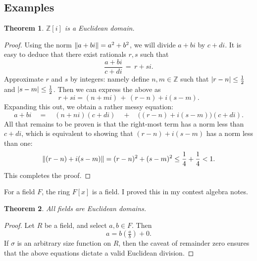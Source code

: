 \documentclass[11pt]{article}
\newtheorem{theorem}{Theorem}
\begin{document}

\subsection{Examples}

\begin{adjustwidth}{0.5cm}{}
  \begin{theorem}
    $\mathbb{Z}[i]$ is a Euclidean domain.
  \end{theorem}
  \begin{proof}
    Using the norm $\norm{a + bi} = a^{2} + b^{2}$, we will divide $a + bi$ by $c + di$. It is easy to deduce that there exist rationals $r, s$ such that
    \[
      \frac{a + bi}{c + di} \, = \, r + si.
    \]
    Approximate $r$ and $s$ by integers: namely define $n, m 
    \in \mathbb{Z}$ such that $\abs{r - n} \le \tfrac{1}{2}$ and $\abs{s - m} \le \tfrac{1}{2}$. Then we can express the above as
    \[
      r + si  = (n + mi ) \, + \, (r - n) + i(s - m).
    \]
    Expanding this out, we obtain a rather messy equation:
    \[
      a + bi \quad = \quad (n + ni )(c + di ) \quad + \quad \big( (r - n) + i(s - m)  \big)(c + di ).
    \]
    All that remains to be proven is that the right-most term has a norm less than $c + di$, which is equivalent to showing that $(r - n) + i (s - m) $ has a norm less than one:
    \[
      \norm{(r - n) + i(s - m) } = (r - n)^{2} + (s - m)^{2} \le \frac{1}{4} + \frac{1}{4} < 1.
    \]
    This completes the proof.
  \end{proof}
\end{adjustwidth}

For a field $F$, the ring $F[x]$ is a field. I proved this in my contest algebra notes.

\begin{adjustwidth}{0.5cm}{}
  \begin{theorem}
    All fields are Euclidean domains.
  \end{theorem}
  \begin{proof}
    Let $R$ be a field, and select $a, b \in F$. Then
    \[
      a = b \left( \tfrac{a}{b} \right) + 0.
    \]
    If $\sigma$ is an arbitrary size function on $R$, then the caveat of remainder zero ensures that the above equations dictate a valid Euclidean division.
  \end{proof}
\end{adjustwidth}

\end{document}
